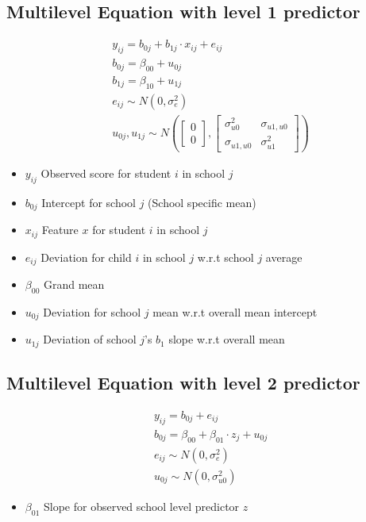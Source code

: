 \subsection{Multilevel Equation with level 1 predictor} 
\begin{align*}
    & y_{ij} = b_{0j} + b_{1j}\cdot x_{ij} + e_{ij} \\
    & b_{0j} = \beta_{00} + u_{0j}\\
    & b_{1j} = \beta_{10} + u_{1j}\\
    & e_{ij} \sim N(0, \sigma_e^2) \\
    & u_{0j}, u_{1j} \sim N(
        \begin{bmatrix} 0 \\ 0 \end{bmatrix}, 
        \begin{bmatrix} \sigma_{u0}^2 & \sigma_{u1,u0} \\ \sigma_{u1,u0} & \sigma_{u1}^2 \end{bmatrix} )
\end{align*}
\begin{itemize}
    \item $y_{ij}$ Observed score for student $i$ in school $j$
    \item $b_{0j}$ Intercept for school $j$ (School specific mean) 
    \item $x_{ij}$ Feature $x$ for student $i$ in school $j$ 
    \item $e_{ij}$ Deviation for child $i$ in school $j$ w.r.t school $j$ average 
    \item $\beta_{00}$ Grand mean 
    \item $u_{0j}$ Deviation for school $j$ mean w.r.t overall mean intercept
    \item $u_{1j}$ Deviation of school $j$'s $b_1$ slope w.r.t overall mean
\end{itemize}



\subsection{Multilevel Equation with level 2 predictor} 
\begin{align*}
    & y_{ij} = b_{0j} + e_{ij} \\
    & b_{0j} = \beta_{00} + \beta_{01} \cdot z_j + u_{0j}\\
    & e_{ij} \sim N(0, \sigma_e^2) \\
    & u_{0j} \sim N(0, \sigma_{u0}^2)
\end{align*}
\begin{itemize}
    \item $\beta_{01}$ Slope for observed school level predictor $z$
\end{itemize}

